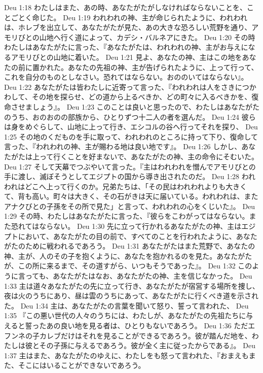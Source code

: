 Deu 1:18  わたしはまた、あの時、あなたがたがしなければならないことを、ことごとく命じた。
Deu 1:19  われわれの神、主が命じられたように、われわれは、ホレブを出立して、あなたがたが見た、あの大きな恐ろしい荒野を通り、アモリびとの山地へ行く道によって、カデシ・バルネアにきた。
Deu 1:20  その時わたしはあなたがたに言った、『あなたがたは、われわれの神、主がお与えになるアモリびとの山地に着いた。
Deu 1:21  見よ、あなたの神、主はこの地をあなたの前に置かれた。あなたの先祖の神、主が告げられたように、上って行って、これを自分のものとしなさい。恐れてはならない。おののいてはならない』。
Deu 1:22  あなたがたは皆わたしに近寄って言った、『われわれは人をさきにつかわして、その地を探らせ、どの道から上るべきか、どの町々に入るべきかを、復命させましょう』。
Deu 1:23  このことは良いと思ったので、わたしはあなたがたのうち、おのおのの部族から、ひとりずつ十二人の者を選んだ。
Deu 1:24  彼らは身をめぐらして、山地に上って行き、エシコルの谷へ行ってそれを探り、
Deu 1:25  その地のくだものを手に取って、われわれのところに持って下り、復命して言った、『われわれの神、主が賜わる地は良い地です』。
Deu 1:26  しかし、あなたがたは上って行くことを好まないで、あなたがたの神、主の命令にそむいた。
Deu 1:27  そして天幕でつぶやいて言った。『主はわれわれを憎んでアモリびとの手に渡し、滅ぼそうとしてエジプトの国から導き出されたのだ。
Deu 1:28  われわれはどこへ上って行くのか。兄弟たちは、「その民はわれわれよりも大きくて、背も高い。町々は大きく、その石がきは天に届いている。われわれは、またアナクびとの子孫をその所で見た」と言って、われわれの心をくじいた』。
Deu 1:29  その時、わたしはあなたがたに言った、『彼らをこわがってはならない。また恐れてはならない。
Deu 1:30  先に立って行かれるあなたがたの神、主はエジプトにおいて、あなたがたの目の前で、すべてのことを行われたように、あなたがたのために戦われるであろう。
Deu 1:31  あなたがたはまた荒野で、あなたの神、主が、人のその子を抱くように、あなたを抱かれるのを見た。あなたがたが、この所に来るまで、その道すがら、いつもそうであった』。
Deu 1:32  このように言っても、あなたがたはなお、あなたがたの神、主を信じなかった。
Deu 1:33  主は道々あなたがたの先に立って行き、あなたがたが宿営する場所を捜し、夜は火のうちにあり、昼は雲のうちにあって、あなたがたに行くべき道を示された。
Deu 1:34  主は、あなたがたの言葉を聞いて怒り、誓って言われた、
Deu 1:35  『この悪い世代の人々のうちには、わたしが、あなたがたの先祖たちに与えると誓ったあの良い地を見る者は、ひとりもないであろう。
Deu 1:36  ただエフンネの子カレブだけはそれを見ることができるであろう。彼が踏んだ地を、わたしは彼とその子孫に与えるであろう。彼が全く主に従ったからである』。
Deu 1:37  主はまた、あなたがたのゆえに、わたしをも怒って言われた、『おまえもまた、そこにはいることができないであろう。
